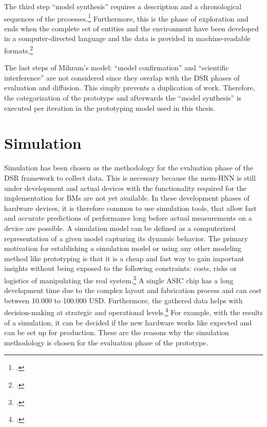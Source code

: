 The third step ``model synthesis'' requires a description and a chronological sequences of the prcoesses.\footcite[cf.][71-72]{mihramSimulationMethodology1976}
Furthermore, this is the phase of exploration and ends when the complete set of entities and the environment have been developed in a computer-directed language and the data is provided in machine-readable formats.\footcite[cf.][75-76]{mihramSimulationMethodology1976}

The last steps of Mihram's model: ``model confirmation'' and ``scientific interference'' are not considered since they overlap with the \ac{DSR} phases of evaluation and diffusion. 
This simply prevents a duplication of work.
Therefore, the categorization of the prototype and afterwards the ``model synthesis'' is executed per iteration in the prototyping model used in this thesis. 

\section{Simulation}

Simulation has been chosen as the methodology for the evaluation phase of the \ac{DSR} framework to collect data.
This is necessary because the \ac{mem-HNN} is still under development and actual devices with the functionality required for the implementation for \ac{BM}s are not yet available.
In these development phases of hardware devices, it is therefore common to use simulation tools, that allow fast and accurate predictions of performance long before actual measurements on a device are possible.
A simulation model can be defined as a computerized representation of a given model capturing its dynamic behavior.
The primary motivation for establishing a simulation model or using any other modeling method like prototyping is that it is
a cheap and fast way to gain important insights without being exposed to the following constraints: costs, risks or logistics of manipulating the real system.\footcite[cf.][92]{kellnerSoftwareProcessSimulation1999}
A single \ac{ASIC} chip has a long development time due to the complex layout and fabrication process and can cost between 10.000 to 100.000 USD.
Furthermore, the gathered data helps with decision-making at strategic and operational levels.\footcite[cf.][93]{kellnerSoftwareProcessSimulation1999}
For example, with the results of a simulation, it can be decided if the new hardware works like expected and can be set up for production.
These are the reasons why the simulation methodology is chosen for the evaluation phase of the prototype. 

